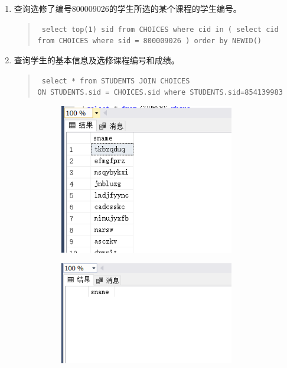 \documentclass[a4paper,twoside]{article}
\begin{document}
\begin{spacing}{1.2}
\begin{enumerate}
\item 查询选修了编号800009026的学生所选的某个课程的学生编号。
\begin{quote}
\texttt{
select top(1) sid from CHOICES
where cid in (
	select cid from CHOICES where sid = 800009026
)
order by NEWID()
}
\end{quote}
\item 查询学生的基本信息及选修课程编号和成绩。
\begin{quote}
\texttt{
select * from STUDENTS JOIN CHOICES \\
ON STUDENTS.sid = CHOICES.sid 
where STUDENTS.sid=854139983
}
\end{quote}


\begin{figure}[h]
\centering
\caption{运行结果}
\begin{subfigure}{0.3\textwidth}
  \includegraphics[width=0.9\textwidth]{fig23.png}
\end{subfigure}
\begin{subfigure}{0.3\textwidth}
  \includegraphics[width=0.9\textwidth]{fig24.png}
\end{subfigure}
\end{figure}



\end{enumerate}
\end{spacing}
\end{document}
